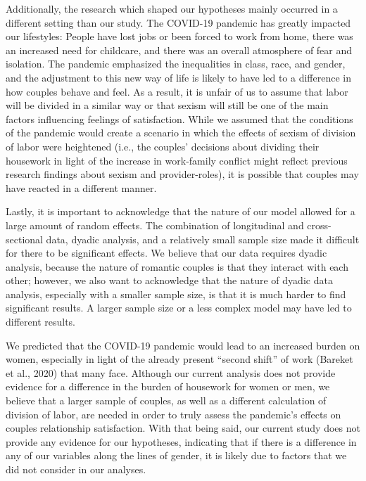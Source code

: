 \documentclass[
  man]{apa6}
\begin{document}
Additionally, the research which shaped our hypotheses mainly occurred in a different setting than our study. The COVID-19 pandemic has greatly impacted our lifestyles: People have lost jobs or been forced to work from home, there was an increased need for childcare, and there was an overall atmosphere of fear and isolation. The pandemic emphasized the inequalities in class, race, and gender, and the adjustment to this new way of life is likely to have led to a difference in how couples behave and feel. As a result, it is unfair of us to assume that labor will be divided in a similar way or that sexism will still be one of the main factors influencing feelings of satisfaction. While we assumed that the conditions of the pandemic would create a scenario in which the effects of sexism of division of labor were heightened (i.e., the couples' decisions about dividing their housework in light of the increase in work-family conflict might reflect previous research findings about sexism and provider-roles), it is possible that couples may have reacted in a different manner.

Lastly, it is important to acknowledge that the nature of our model allowed for a large amount of random effects. The combination of longitudinal and cross-sectional data, dyadic analysis, and a relatively small sample size made it difficult for there to be significant effects. We believe that our data requires dyadic analysis, because the nature of romantic couples is that they interact with each other; however, we also want to acknowledge that the nature of dyadic data analysis, especially with a smaller sample size, is that it is much harder to find significant results. A larger sample size or a less complex model may have led to different results.

We predicted that the COVID-19 pandemic would lead to an increased burden on women, especially in light of the already present ``second shift'' of work (Bareket et al., 2020) that many face. Although our current analysis does not provide evidence for a difference in the burden of housework for women or men, we believe that a larger sample of couples, as well as a different calculation of division of labor, are needed in order to truly assess the pandemic's effects on couples relationship satisfaction. With that being said, our current study does not provide any evidence for our hypotheses, indicating that if there is a difference in any of our variables along the lines of gender, it is likely due to factors that we did not consider in our analyses.
\end{document}
